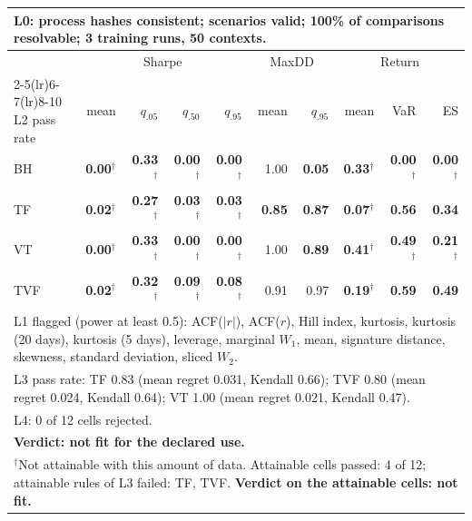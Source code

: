 \begin{tabular}{lrrrrrrrrr}
\toprule
\multicolumn{10}{p{13.5cm}}{L0: process hashes consistent; scenarios valid; 100\% of comparisons resolvable; 3 training runs, 50 contexts.} \\
\midrule
 & \multicolumn{4}{c}{Sharpe} & \multicolumn{2}{c}{MaxDD} & \multicolumn{3}{c}{Return} \\
\cmidrule(lr){2-5}\cmidrule(lr){6-7}\cmidrule(lr){8-10}
L2 pass rate & mean & $q_{.05}$ & $q_{.50}$ & $q_{.95}$ & mean & $q_{.95}$ & mean & VaR & ES \\
\midrule
BH & \textbf{0.00}$^{\dagger}$ & \textbf{0.33}$^{\dagger}$ & \textbf{0.00}$^{\dagger}$ & \textbf{0.00}$^{\dagger}$ & 1.00 & \textbf{0.05} & \textbf{0.33}$^{\dagger}$ & \textbf{0.00}$^{\dagger}$ & \textbf{0.00}$^{\dagger}$ \\
TF & \textbf{0.02}$^{\dagger}$ & \textbf{0.27}$^{\dagger}$ & \textbf{0.03}$^{\dagger}$ & \textbf{0.03}$^{\dagger}$ & \textbf{0.85} & \textbf{0.87} & \textbf{0.07}$^{\dagger}$ & \textbf{0.56} & \textbf{0.34} \\
VT & \textbf{0.00}$^{\dagger}$ & \textbf{0.33}$^{\dagger}$ & \textbf{0.00}$^{\dagger}$ & \textbf{0.00}$^{\dagger}$ & 1.00 & \textbf{0.89} & \textbf{0.41}$^{\dagger}$ & \textbf{0.49}$^{\dagger}$ & \textbf{0.21}$^{\dagger}$ \\
TVF & \textbf{0.02}$^{\dagger}$ & \textbf{0.32}$^{\dagger}$ & \textbf{0.09}$^{\dagger}$ & \textbf{0.08}$^{\dagger}$ & 0.91 & 0.97 & \textbf{0.19}$^{\dagger}$ & \textbf{0.59} & \textbf{0.49} \\
\midrule
\multicolumn{10}{p{13.5cm}}{L1 flagged (power at least 0.5): ACF($|r|$), ACF($r$), Hill index, kurtosis, kurtosis (20 days), kurtosis (5 days), leverage, marginal $W_1$, mean, signature distance, skewness, standard deviation, sliced $W_2$.} \\
\multicolumn{10}{p{13.5cm}}{L3 pass rate: TF 0.83 (mean regret 0.031, Kendall 0.66); TVF 0.80 (mean regret 0.024, Kendall 0.64); VT 1.00 (mean regret 0.021, Kendall 0.47).} \\
\multicolumn{10}{p{13.5cm}}{L4: 0 of 12 cells rejected.} \\
\multicolumn{10}{p{13.5cm}}{\textbf{Verdict: not fit for the declared use.}} \\
\multicolumn{10}{p{13.5cm}}{$^{\dagger}$Not attainable with this amount of data. Attainable cells passed: 4 of 12; attainable rules of L3 failed: TF, TVF. \textbf{Verdict on the attainable cells: not fit.}} \\
\bottomrule
\end{tabular}

